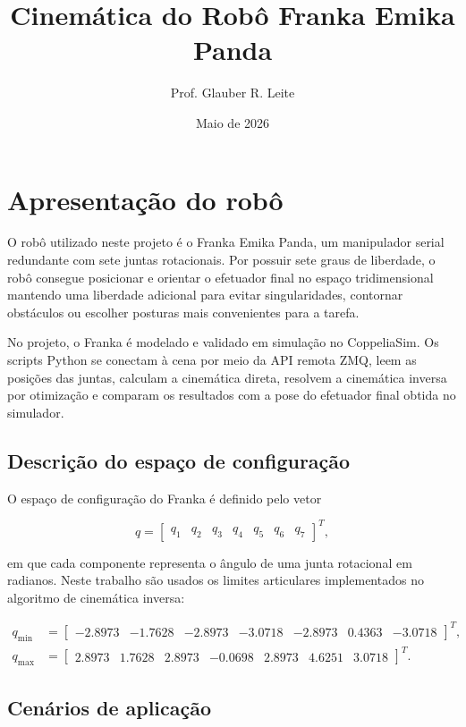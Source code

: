 \documentclass{article}
\title{Cinemática do Robô Franka Emika Panda}
\author{Prof. Glauber R. Leite}
\date{Maio de 2026}
\begin{document}
\maketitle

\section{Apresentação do robô}

O robô utilizado neste projeto é o Franka Emika Panda, um manipulador serial
redundante com sete juntas rotacionais. Por possuir sete graus de liberdade, o
robô consegue posicionar e orientar o efetuador final no espaço tridimensional
mantendo uma liberdade adicional para evitar singularidades, contornar
obstáculos ou escolher posturas mais convenientes para a tarefa.

No projeto, o Franka é modelado e validado em simulação no CoppeliaSim. Os
scripts Python se conectam à cena por meio da API remota ZMQ, leem as posições
das juntas, calculam a cinemática direta, resolvem a cinemática inversa por
otimização e comparam os resultados com a pose do efetuador final obtida no
simulador.

\subsection{Descrição do espaço de configuração}

O espaço de configuração do Franka é definido pelo vetor

\[
q =
\begin{bmatrix}
q_1 & q_2 & q_3 & q_4 & q_5 & q_6 & q_7
\end{bmatrix}^{T},
\]

em que cada componente representa o ângulo de uma junta rotacional em radianos.
Neste trabalho são usados os limites articulares implementados no algoritmo de
cinemática inversa:

\[
\begin{aligned}
q_{\min} &=
\begin{bmatrix}
-2.8973 & -1.7628 & -2.8973 & -3.0718 & -2.8973 & 0.4363 & -3.0718
\end{bmatrix}^{T},\\
q_{\max} &=
\begin{bmatrix}
2.8973 & 1.7628 & 2.8973 & -0.0698 & 2.8973 & 4.6251 & 3.0718
\end{bmatrix}^{T}.
\end{aligned}
\]

\subsection{Cenários de aplicação}
\end{document}
